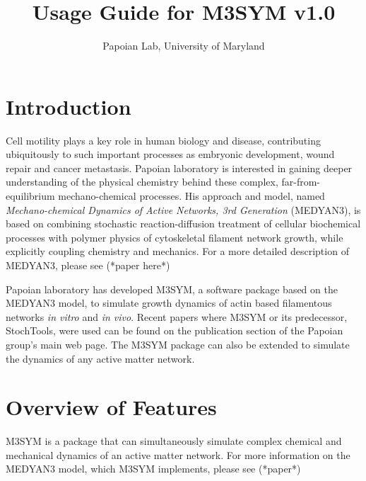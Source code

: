\documentclass[11pt, oneside]{article}   	%
\title{Usage Guide for M3SYM v1.0}
\author{Papoian Lab, University of Maryland}
\date{}							%
\begin{document}
\maketitle



\tableofcontents

\newpage
\section {Introduction}

 Cell motility plays a key role in human biology and disease, contributing ubiquitously
 to such important processes as embryonic development, wound repair and cancer 
 metastasis. Papoian laboratory is interested in gaining deeper understanding of the
 physical chemistry behind these complex, far-from-equilibrium mechano-chemical 
 processes. His approach and model, named \textit{Mechano-chemical Dynamics of Active Networks,
 3rd Generation} (MEDYAN3), is based on combining stochastic reaction-diffusion treatment
 of cellular biochemical processes with polymer physics of cytoskeletal filament network 
 growth, while explicitly coupling chemistry and mechanics. For a more detailed description of MEDYAN3, 
 please see (*paper here*)
 
 Papoian laboratory has developed M3SYM, a software package based on the MEDYAN3
 model, to simulate growth dynamics of actin based filamentous networks \textit{in vitro} and 
 \textit{in vivo}. Recent papers where M3SYM or its predecessor, StochTools, were used 
 can be found on the publication section of the Papoian group's main web page. 
 The M3SYM package can also be extended to simulate the dynamics of any active matter network.

\section {Overview of Features}

M3SYM is a package that can simultaneously simulate complex chemical and mechanical dynamics
of an active matter network. For more information on the MEDYAN3 model, which M3SYM implements,
please see (*paper*)
\end{document}
